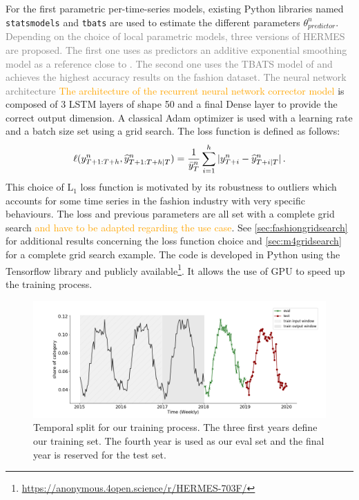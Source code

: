 \documentclass[10pt]{article} %
\newcommand{\ts}{y}
\newcommand{\tspred}{\widehat{\ts}}
\newcommand{\statparam}{\theta_{predictor}}
\newcommand{\lag}{h}
\newcommand{\meants}{\Bar{\ts}}
\begin{document}
For the first parametric per-time-series models, existing Python  libraries named \texttt{statsmodels} and  \texttt{tbats} are used to estimate the different parameters $\statparam^n$. \textcolor{gray}{Depending on the choice of local parametric models, three versions of HERMES are proposed. The first one uses as predictors an additive exponential smoothing model as a reference close to \citet{smyl2020}. The second one uses the TBATS model of \citet{alysha2011} and  achieves the highest accuracy results on the fashion dataset. The neural network architecture} \textcolor{orange}{The architecture of the recurrent neural network corrector model} is composed of 3 LSTM layers of shape 50 and a final Dense layer to provide the correct output dimension. A classical Adam optimizer is used with a learning rate and a batch size set using a grid search. The loss function is defined as follows:
$$
\ell(\ts^n_{T+1:T+\lag},\tspred^n_{T+1:T+\lag|T}) = \frac{1}{\meants^n_T}\sum_{i=1}^{\lag}|\ts^n_{T+i} - \tspred^n_{T+i|T}|\,.
$$
This choice of $\mathrm{L}_1$ loss function is motivated by its robustness to outliers which accounts for some time series in the fashion industry with very specific behaviours. The loss and previous parameters are all set with a complete grid search \textcolor{orange}{and have to be adapted regarding the use case}. See \ref{sec:fashiongridsearch} for additional results concerning the loss function choice and \ref{sec:m4gridsearch} for a complete grid search example. The code is developed in Python using the Tensorflow library and publicly available\footnote[1]{\url{https://anonymous.4open.science/r/HERMES-703F/}}. It allows the use of GPU to speed up the training process.



\begin{figure}
  \centering
    \includegraphics[width=1.\linewidth]{train_eval_test_set}
  \caption{Temporal split for our training process. The three first years define our training set. The fourth year is used as our eval set and the final year is reserved for the test set.}
\label{fig:train_eval_test_set}
\end{figure}
\end{document}
